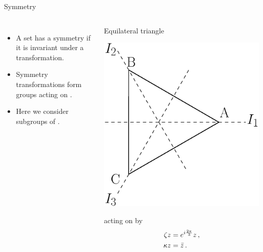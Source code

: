 \documentclass{beamer}
\begin{document}
\begin{frame}{Symmetry}

\begin{columns}
	\begin{itemize}
		\item A set has a symmetry if it is invariant under a transformation.
		\item Symmetry transformations form groups acting on .
		\item Here we consider subgroups of .
	\end{itemize}
	\begin{exampleblock}{Equilateral triangle}
	 	\begin{center}
			\includegraphics[width=.7\textwidth]{../../figs/D3triangle}
		\end{center}
	 acting on \Clx{} by
	\[
	\begin{split}	
  		\zeta z &= e^{i\frac{2\pi}{3}} z\,,\\
  		\kappa z  &= \bar{z}\,.
 	\end{split}
	\]
	\end{exampleblock}
\end{columns}

\end{frame}
\end{document}
